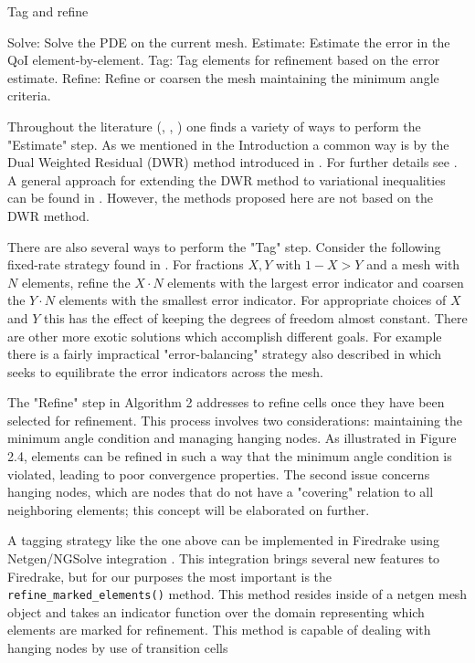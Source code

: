 \documentclass[]{interact}
\theoremstyle{plain}%
\theoremstyle{definition}
\theoremstyle{remark}
\begin{document}
\begin{algorithm}
  \caption{Tag and refine}
  \begin{algorithmic}
    \State Solve: Solve the PDE on the current mesh. 
    \State Estimate: Estimate the error in the QoI element-by-element.
    \State Tag: Tag elements for refinement based on the error estimate.
    \State Refine: Refine or coarsen the mesh maintaining the minimum angle criteria.
  \end{algorithmic}
\end{algorithm}

Throughout the literature (\citet{becker_feed-back_1996}, \citet{bangerth_adaptive_2003}, \citet{suttmeier_numerical_2008}) one finds a variety of ways to perform the "Estimate" step. As we mentioned in the Introduction a common way is by the Dual Weighted Residual (DWR) method introduced in \citet{becker_feed-back_1996}. For further details see \citet[Chapter 3]{bangerth_adaptive_2003}. A general approach for extending the DWR method to variational inequalities can be found in \citet{suttmeier_numerical_2008}.  However, the methods proposed here are not based on the DWR method. 

There are also several ways to perform the "Tag" step. Consider the following fixed-rate strategy found in \citet[Chapter 4]{bangerth_adaptive_2003}. For fractions $X, Y$ with $1 - X > Y$ and a mesh with $N$ elements, refine the $X\cdot N$ elements with the largest error indicator and coarsen the $Y\cdot N$ elements with the smallest error indicator. For appropriate choices of $X$ and $Y$ this has the effect of keeping the degrees of freedom almost constant. There are other more exotic solutions which accomplish different goals. For example there is a fairly impractical "error-balancing" strategy also described in \citet[Chapter 4]{bangerth_adaptive_2003} which seeks to equilibrate the error indicators across the mesh.

The "Refine" step in Algorithm 2 addresses to refine cells once they have been selected for refinement. This process involves two considerations: maintaining the minimum angle condition and managing hanging nodes. As illustrated in Figure 2.4, elements can be refined in such a way that the minimum angle condition is violated, leading to poor convergence properties. The second issue concerns hanging nodes, which are nodes that do not have a "covering" relation to all neighboring elements; this concept will be elaborated on further.

A tagging strategy like the one above can be implemented in Firedrake using Netgen/NGSolve integration \citep{zerbinati_ngspetsc_nodate}.  This integration brings several new features to Firedrake, but for our purposes the most important is the \texttt{refine\_marked\_elements()} method.  This method resides inside of a netgen mesh object and takes an indicator function over the domain representing which elements are marked for refinement. This method is capable of dealing with hanging nodes by use of transition cells
\end{document}
